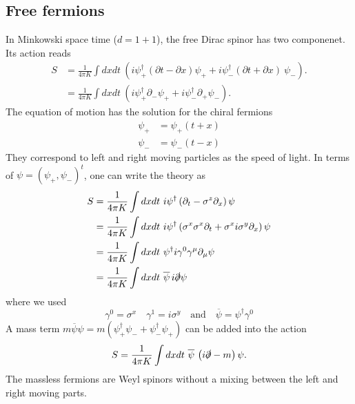 \documentclass[submission, PhysLectNotes]{SciPost}
\begin{document}
\subsection{Free fermions}
In Minkowski space time ($d=1+1$), the free Dirac spinor has two componenet. Its action reads~\cite{Blumenhagen:2009zz,tong_gr}
\begin{equation}
	\begin{aligned}
		S &= \frac{1}{4\pi K}\int dxdt \ \left(i\psi_{+}^\dagger (\partial t - \partial x) \psi_{+} + i \psi_{-}^\dagger(\partial t + \partial x)\ \psi_{-} \right). \\		
		&= \frac{1}{4\pi K}\int dxdt \ \left(i\psi_{+}^\dagger \partial_{-} \psi_{+} + i \psi_{-}^\dagger \partial_{+} \psi_{-} \right). 
	\end{aligned}
\end{equation}
The equation of motion has the solution for the chiral fermions 
\begin{equation}
	\begin{aligned}
		\psi_{+} &= \psi_{+} \left(t+x\right) \\
		\psi_{-} &= \psi_{-} \left( t-x \right)
	\end{aligned}
\end{equation}
They correspond to left and right moving particles as the speed of light. In terms of $\psi = {(\psi_{+},\psi_{-})}^t$, one can write the theory as
\begin{equation}
	\begin{aligned}
		S &= \frac{1}{4\pi K} \int dxdt \ i \psi^\dagger \left( \partial_t - \sigma^z\partial_x\right)\psi \\
    &= \frac{1}{4\pi K} \int dxdt \ i \psi^\dagger \left( \sigma^x \sigma^x \partial_t + \sigma^x i\sigma^y \partial_x\right)\psi \\
	&= \frac{1}{4\pi K} \int dxdt \ \psi^\dagger i \gamma^0 \gamma^\mu \partial_\mu \psi\\
	&= \frac{1}{4\pi K} \int dxdt \ \overline{\psi} \, i \slashed{\partial} \psi
	\end{aligned}
\end{equation}
where we used
\begin{equation}
    \gamma^0 = \sigma^x \quad \gamma^1 = i\sigma^y \quad \mathrm{and} \quad \overline{\psi} = \psi^\dagger \gamma^0
\end{equation}
A mass term $m\overline{\psi}\psi = m \left(\psi_{+}^\dagger \psi_{-} +\psi_{-}^\dagger \psi_{+}\right) $ can be added into the action
\begin{equation}
	S = \frac{1}{4\pi K} \int dxdt \ \overline{\psi} \, \left( i \slashed{\partial} - m \right) \psi.
\end{equation}
The massless fermions are Weyl spinors without a mixing between the left and right moving parts. \\
\end{document}
